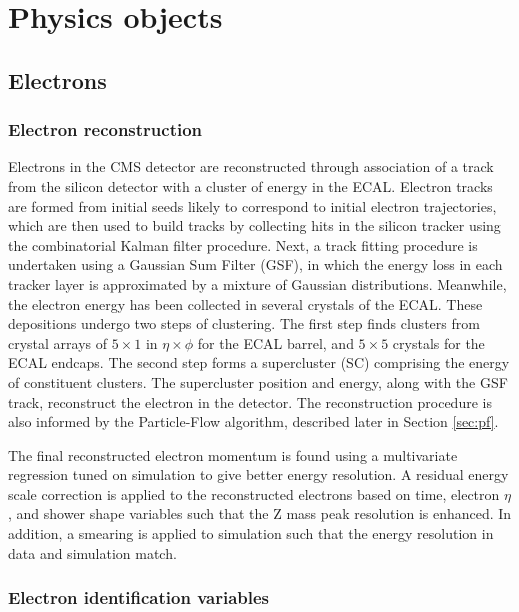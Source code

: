 \chapter{Physics objects}
\label{chap:objects}
\section{Electrons}
\subsection{Electron reconstruction}
Electrons in the CMS detector are reconstructed through association of a track from the silicon detector with a cluster of energy in the ECAL.
Electron tracks are formed from initial seeds likely to correspond to initial electron trajectories, which are then used to build tracks by collecting hits in the silicon tracker using the combinatorial Kalman filter procedure.
Next, a track fitting procedure is undertaken using a Gaussian Sum Filter (GSF), in which the energy loss in each tracker layer is approximated by a mixture of Gaussian distributions.
Meanwhile, the electron energy has been collected in several crystals of the ECAL. 
These depositions undergo two steps of clustering.
The first step finds clusters from crystal arrays of $5 \times 1$ in $\eta \times \phi$ for the ECAL barrel, and $5 \times 5$ crystals for the ECAL endcaps.
The second step forms a supercluster (SC) comprising the energy of constituent clusters.
The supercluster position and energy, along with the GSF track, reconstruct the electron in the detector.\cite{ElectronReco2015}
The reconstruction procedure is also informed by the Particle-Flow algorithm, described later in Section \ref{sec:pf}.

The final reconstructed electron momentum is found using a multivariate regression tuned on simulation to give better energy resolution.
A residual energy scale correction is applied to the reconstructed electrons based on time, electron $\eta$, and shower shape variables
such that the Z mass peak resolution is enhanced.  In addition, a smearing is applied to simulation such that the energy resolution in data and simulation match.


\subsection{Electron identification variables}


